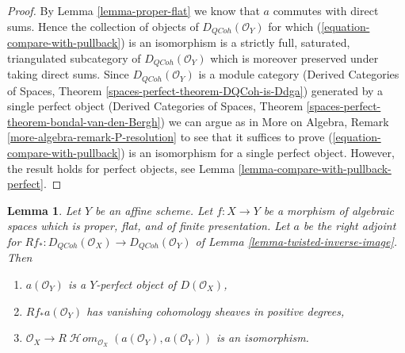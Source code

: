 \documentclass{stacks-project}
\theoremstyle{plain}
\newtheorem{lemma}[subsection]{Lemma}
\theoremstyle{definition}
\theoremstyle{remark}
\numberwithin{equation}{subsection}
\def\SheafHom{\mathop{\mathcal{H}\!\mathit{om}}\nolimits}
\def\QCoh{\mathit{QCoh}}
\begin{document}
\begin{proof}
By Lemma \ref{lemma-proper-flat} we know that $a$ commutes
with direct sums. Hence the collection of objects of
$D_\QCoh(\mathcal{O}_Y)$ for which (\ref{equation-compare-with-pullback})
is an isomorphism is a strictly full, saturated, triangulated
subcategory of $D_\QCoh(\mathcal{O}_Y)$ which is moreover
preserved under taking direct sums. Since $D_\QCoh(\mathcal{O}_Y)$
is a module category (Derived Categories of Spaces, Theorem
\ref{spaces-perfect-theorem-DQCoh-is-Ddga}) generated by a single
perfect object (Derived Categories of Spaces, Theorem
\ref{spaces-perfect-theorem-bondal-van-den-Bergh})
we can argue as in
More on Algebra, Remark \ref{more-algebra-remark-P-resolution}
to see that it suffices to prove (\ref{equation-compare-with-pullback})
is an isomorphism for a single perfect object.
However, the result holds for perfect objects, see
Lemma \ref{lemma-compare-with-pullback-perfect}.
\end{proof}

\begin{lemma}
\label{lemma-properties-relative-dualizing}
Let $Y$ be an affine scheme. Let $f : X \to Y$ be a morphism of
algebraic spaces which is proper, flat, and of finite presentation.
Let $a$ be the right adjoint for
$Rf_* : D_\QCoh(\mathcal{O}_X) \to D_\QCoh(\mathcal{O}_Y)$ of
Lemma \ref{lemma-twisted-inverse-image}.
Then
\begin{enumerate}
\item $a(\mathcal{O}_Y)$ is a $Y$-perfect object of $D(\mathcal{O}_X)$,
\item $Rf_*a(\mathcal{O}_Y)$ has vanishing cohomology sheaves
in positive degrees,
\item $\mathcal{O}_X \to
R\SheafHom_{\mathcal{O}_X}(a(\mathcal{O}_Y), a(\mathcal{O}_Y))$
is an isomorphism.
\end{enumerate}
\end{lemma}
\end{document}

